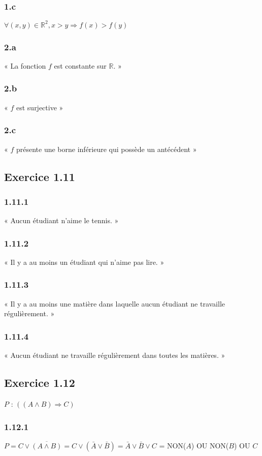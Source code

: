 \documentclass[a4paper,10pt]{report}
\begin{document}
\subsubsection*{1.c}
$\forall (x,y) \in \mathbb{R}^2, x > y \Longrightarrow f(x) > f(y)$
\subsubsection*{2.a}
« La fonction $f$ est constante sur $\mathbb{R}$. »
\subsubsection*{2.b}
« $f$ est surjective »
\subsubsection*{2.c}
« $f$ présente une borne inférieure qui possède un antécédent »


\subsection*{Exercice 1.11}
\subsubsection*{1.11.1}
« Aucun étudiant n'aime le tennis. »
\subsubsection*{1.11.2}
« Il y a au moins un étudiant qui n'aime pas lire. »
\subsubsection*{1.11.3}
« Il y a au moins une matière dans laquelle aucun étudiant ne travaille régulièrement. »
\subsubsection*{1.11.4}
« Aucun étudiant ne travaille régulièrement dans toutes les matières. »


\subsection*{Exercice 1.12}
$P$ : $((A \wedge B) \Longrightarrow C)$
\subsubsection*{1.12.1}
$P = C \vee \overline{(A \wedge B)} = C \vee (\bar{A} \vee \bar{B}) = \bar{A} \vee \bar{B} \vee C$ = NON($A$) OU NON($B$) OU $C$
\end{document}
